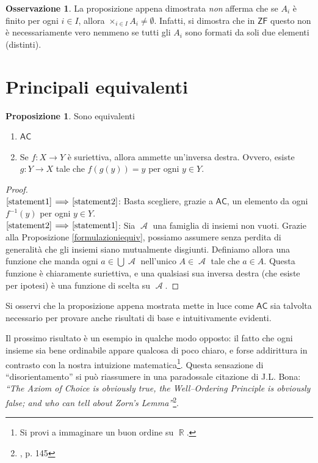 \documentclass[12pt,a4paper]{report}
\theoremstyle{definition}
\newtheorem{oss}[teo]{Osservazione}  %
\newtheorem{prop}[teo]{Proposizione}  %
\theoremstyle{num.custom-title}
\DeclareMathOperator{\A}{\mathcal{A}}
\DeclareMathOperator{\R}{\mathbb{R}}
\newcommand{\AC}{\ensuremath{\mathsf{AC}}\xspace}
\newcommand{\ZF}{\ensuremath{\mathsf{ZF}}\xspace}
\newcommand{\Implies}[2]{$\text{\ref{statement#1}}\!\implies\!\text{\ref{statement#2}}$}%
\newcommand{\punto}[1]{\item \label{statement#1}}
\newenvironment{equivalence}
    {\begin{enumerate}[label=(\arabic*),ref=(\arabic*)]
    }
    { 
	\end{enumerate}
    }
\begin{document}
\begin{oss}
La proposizione appena dimostrata \emph{non} afferma che se $A_i$ è finito per ogni $i \in I$, allora $\times_{i \in I} A_i \neq \emptyset$. Infatti, si dimostra che in \ZF questo non è necessariamente vero nemmeno se tutti gli $A_i$ sono formati da soli due elementi (distinti). 
\end{oss}


\section{Principali equivalenti}


\begin{prop}
Sono equivalenti
\begin{equivalence}
\punto{1} \AC
\punto{2} Se $f : X \to Y$ è suriettiva, allora ammette un'inversa destra. Ovvero, esiste $g: Y \to X$ tale che $f(g(y))=y$ per ogni $y \in Y$.
\end{equivalence}
\begin{proof}\ \\
\Implies{1}{2}: Basta scegliere, grazie a \AC, un elemento da ogni $f^{-1}(y)$ per ogni $y \in Y$.\\
\Implies{2}{1}: Sia $\A$ una famiglia di insiemi non vuoti. Grazie alla Proposizione \ref{formulazioniequiv}, possiamo assumere senza perdita di generalità che gli insiemi siano mutualmente disgiunti. Definiamo allora una funzione che manda ogni $a \in \bigcup\A$ nell'unico $A \in \A$ tale che $a \in A$. Questa funzione è chiaramente suriettiva, e una qualsiasi sua inversa destra (che esiste per ipotesi) è una funzione di scelta su $\A$.
\end{proof}
\end{prop}

Si osservi che la proposizione appena mostrata mette in luce come \AC sia talvolta necessario per provare anche risultati di base e intuitivamente evidenti.

Il prossimo risultato è un esempio in qualche modo opposto: il fatto che ogni insieme sia bene ordinabile appare qualcosa di poco chiaro, e forse addirittura in contrasto con la nostra intuizione matematica\footnote{Si provi a immaginare un buon ordine su $\R$.}. Questa sensazione di ``disorientamento'' si può riassumere in una paradossale citazione di J.L. Bona: \emph{``The Axiom of Choice is obviously true, the Well–Ordering Principle is obviously false; and who can tell about Zorn’s Lemma''}\footnote{\cite{Sch97:Herrlich}, p. 145}.
\end{document}
